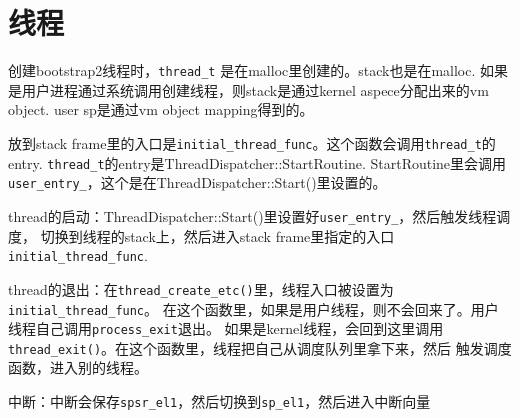 \section{线程}

创建bootstrap2线程时，\verb|thread_t| 是在malloc里创建的。stack也是在malloc.
如果是用户进程通过系统调用创建线程，则stack是通过kernel aspece分配出来的vm object.
user sp是通过vm object mapping得到的。

放到stack frame里的入口是\verb|initial_thread_func|。这个函数会调用\verb|thread_t|的entry.
\verb|thread_t|的entry是ThreadDispatcher::StartRoutine. StartRoutine里会调用
\verb|user_entry_|，这个是在ThreadDispatcher::Start()里设置的。

thread的启动：ThreadDispatcher::Start()里设置好\verb|user_entry_|，然后触发线程调度，
切换到线程的stack上，然后进入stack frame里指定的入口\verb|initial_thread_func|.

thread的退出：在\verb|thread_create_etc()|里，线程入口被设置为\verb|initial_thread_func|。
在这个函数里，如果是用户线程，则不会回来了。用户线程自己调用\verb|process_exit|退出。
如果是kernel线程，会回到这里调用\verb|thread_exit()|。在这个函数里，线程把自己从调度队列里拿下来，然后
触发调度函数，进入别的线程。

中断：中断会保存\verb|spsr_el1|，然后切换到\verb|sp_el1|，然后进入中断向量